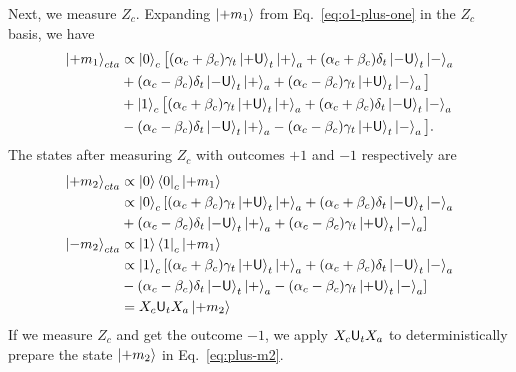 \documentclass[11pt]{article}
\begin{document}
Next, we measure $Z_c$. Expanding $\ket{+m_1}$ from Eq.~\eqref{eq:o1-plus-one} in the $Z_c$ basis, we have
\begin{align}
    \ket{+m_1}_{cta}&\propto\ket{0}_c \big [(\alpha_c+\beta_c)\gamma_t\ket{+\mathsf{U}}_t\ket{+}_a+(\alpha_c+\beta_c)\delta_t\ket{-\mathsf{U}}_t\ket{-}_a\notag\\
    &+(\alpha_c-\beta_c)\delta_t\ket{-\mathsf{U}}_t\ket{+}_a+(\alpha_c-\beta_c)\gamma_t\ket{+\mathsf{U}}_t\ket{-}_a \big]\notag\\
    &+\ket{1}_c \big [(\alpha_c+\beta_c)\gamma_t\ket{+\mathsf{U}}_t\ket{+}_a+(\alpha_c+\beta_c)\delta_t\ket{-\mathsf{U}}_t\ket{-}_a\notag\\
    &-(\alpha_c-\beta_c)\delta_t\ket{-\mathsf{U}}_t\ket{+}_a-(\alpha_c-\beta_c)\gamma_t\ket{+\mathsf{U}}_t\ket{-}_a \big].
\end{align}
The states after measuring $Z_c$ with outcomes $+1$ and $-1$ respectively are
\begin{align}
    \ket{+m_2}_{cta} &\propto \ket{0}\bra{0}_c \ket{+m_1}\label{eq:plus-m2}\\
    &\propto\ket{0}_c[(\alpha_c+\beta_c)\gamma_t\ket{+\mathsf{U}}_t\ket{+}_a+(\alpha_c+\beta_c)\delta_t\ket{-\mathsf{U}}_t\ket{-}_a\notag\\
    &+(\alpha_c-\beta_c)\delta_t\ket{-\mathsf{U}}_t\ket{+}_a+(\alpha_c-\beta_c)\gamma_t\ket{+\mathsf{U}}_t\ket{-}_a]\notag\\
    \ket{-m_2}_{cta}&\propto\ket{1}\bra{1}_c\ket{+m_1}\notag\\
    &\propto\ket{1}_c[(\alpha_c+\beta_c)\gamma_t\ket{+\mathsf{U}}_t\ket{+}_a+(\alpha_c+\beta_c)\delta_t\ket{-\mathsf{U}}_t\ket{-}_a\notag\\
    &-(\alpha_c-\beta_c)\delta_t\ket{-\mathsf{U}}_t\ket{+}_a-(\alpha_c-\beta_c)\gamma_t\ket{+\mathsf{U}}_t\ket{-}_a]\\
    &=X_c\mathsf{U}_t X_a\ket{+m_2}
\end{align}
If we measure $Z_c$ and get the outcome $-1$, we apply $X_c\mathsf{U}_tX_a$ to deterministically prepare the state $\ket{+m_2}$ in Eq.~\eqref{eq:plus-m2}.
\end{document}
